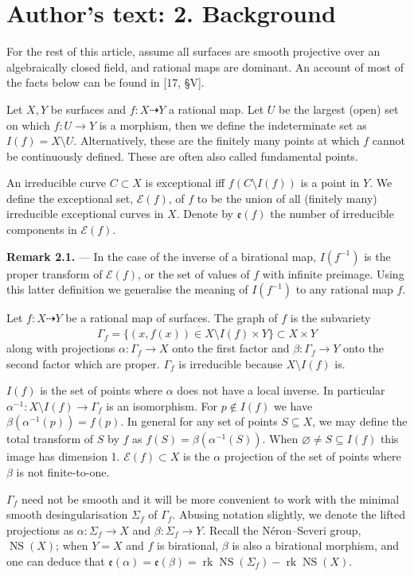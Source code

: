 \documentclass[11pt]{article}
\newcommand{\rat}{\dashrightarrow}
\newcommand{\NS}{\operatorname{NS}}
\newcommand{\exc}{\mathfrak{e}}
\newcommand{\sourceheading}[1]{\par\medskip\noindent\textbf{#1.} --- }
\begin{document}
\section*{Author's text: 2. Background}
For the rest of this article, assume all surfaces are smooth projective
over an algebraically closed field, and rational maps are dominant. An
account of most of the facts below can be found in [17, \S V].

Let $X,Y$ be surfaces and $f:X\rat Y$ a rational map. Let $U$ be the
largest (open) set on which $f:U\to Y$ is a morphism, then we define the
indeterminate set as $I(f)=X\setminus U$. Alternatively, these are the
finitely many points at which $f$ cannot be continuously defined. These
are often also called fundamental points.

An irreducible curve $C\subset X$ is exceptional iff $f(C\setminus I(f))$
is a point in $Y$. We define the exceptional set, $\mathcal E(f)$, of $f$
to be the union of all (finitely many) irreducible exceptional curves in
$X$. Denote by $\exc(f)$ the number of irreducible components in
$\mathcal E(f)$.

\sourceheading{Remark 2.1}
In the case of the inverse of a birational map, $I(f^{-1})$ is the proper
transform of $\mathcal E(f)$, or the set of values of $f$ with infinite
preimage. Using this latter definition we generalise the meaning of
$I(f^{-1})$ to any rational map $f$.

Let $f:X\rat Y$ be a rational map of surfaces. The graph of $f$ is the
subvariety
\[
 \Gamma_f=\overline{\{(x,f(x))\in X\setminus I(f)\times Y\}}
 \subset X\times Y
\]
along with projections $\alpha:\Gamma_f\to X$ onto the first factor and
$\beta:\Gamma_f\to Y$ onto the second factor which are proper.
$\Gamma_f$ is irreducible because $X\setminus I(f)$ is.

$I(f)$ is the set of points where $\alpha$ does not have a local inverse.
In particular $\alpha^{-1}:X\setminus I(f)\to\Gamma_f$ is an isomorphism.
For $p\notin I(f)$ we have $\beta(\alpha^{-1}(p))=f(p)$. In general for
any set of points $S\subseteq X$, we may define the total transform of $S$
by $f$ as $f(S)=\beta(\alpha^{-1}(S))$. When
$\varnothing\neq S\subseteq I(f)$ this image has dimension 1.
$\mathcal E(f)\subset X$ is the $\alpha$ projection of the set of points
where $\beta$ is not finite-to-one.

$\Gamma_f$ need not be smooth and it will be more convenient to work with
the minimal smooth desingularisation $\Sigma_f$ of $\Gamma_f$. Abusing
notation slightly, we denote the lifted projections as
$\alpha:\Sigma_f\to X$ and $\beta:\Sigma_f\to Y$. Recall the
Néron--Severi group, $\NS(X)$; when $Y=X$ and $f$ is birational, $\beta$
is also a birational morphism, and one can deduce that
$\exc(\alpha)=\exc(\beta)=\operatorname{rk}\NS(\Sigma_f)-\operatorname{rk}\NS(X)$.
\end{document}
